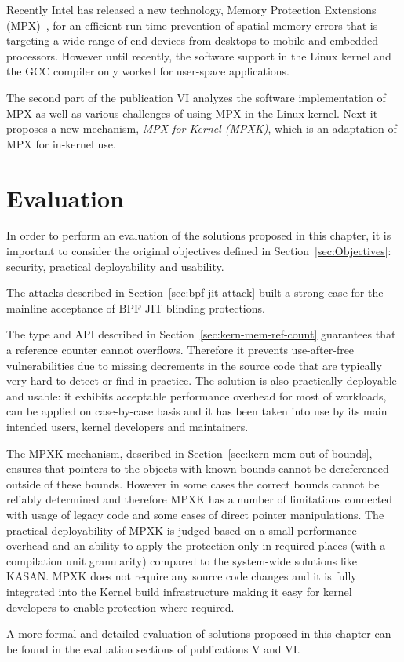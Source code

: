 Recently Intel has released a new technology, \intel Memory Protection Extensions (MPX)~\cite{ramakesavan2015intel}, for an efficient run-time prevention of spatial memory errors that is targeting a wide range of end devices from desktops to mobile and embedded processors.
However until recently, the software support in the Linux kernel and the GCC compiler only worked for user-space applications. 
 
The second part of the publication VI analyzes the software implementation of \intel MPX as well as various challenges of using MPX in the Linux kernel. Next it proposes a new mechanism, \emph{MPX for Kernel (MPXK)}, which is an adaptation of \intel MPX for in-kernel use.

\section{Evaluation}

In order to perform an evaluation of the solutions proposed in this chapter, it is important to consider the original objectives defined in Section~\ref{sec:Objectives}: security, practical deployability and usability. 

The attacks described in Section~\ref{sec:bpf-jit-attack} built a strong case for the mainline acceptance of BPF JIT blinding protections.

The  type and API described in Section~\ref{sec:kern-mem-ref-count} guarantees that a reference counter cannot overflows. Therefore it prevents use-after-free vulnerabilities due to missing decrements in the source code that are typically very hard to detect or find in practice. The solution is also practically deployable and usable: it exhibits acceptable performance overhead for most of workloads, can be applied on case-by-case basis and it has been taken into use by its main intended users, kernel developers and maintainers. 

The MPXK mechanism, described in Section~\ref{sec:kern-mem-out-of-bounds}, ensures that pointers to the objects with known bounds cannot be dereferenced outside of these bounds. However in some cases the correct bounds cannot be reliably determined and therefore MPXK has a number of limitations connected with usage of legacy code and some cases of direct pointer manipulations. The practical deployability of MPXK is judged based on a small performance overhead and an ability to apply the protection only in required places (with a compilation unit granularity) compared to the system-wide solutions like KASAN. MPXK does not require any source code changes and it is fully integrated into the Kernel build infrastructure making it easy for kernel developers to enable protection where required.  

A more formal and detailed evaluation of solutions proposed in this chapter can be found in the evaluation sections of publications V and VI. 
